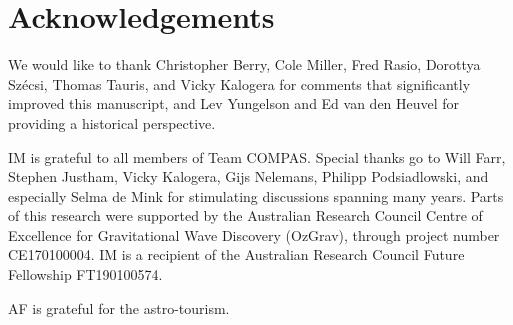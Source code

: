 \documentclass[review]{elsarticle}
\begin{document}
\section*{Acknowledgements}
We would like to thank Christopher Berry, Cole Miller, Fred Rasio, Dorottya Sz\'{e}csi, Thomas Tauris, and Vicky Kalogera for comments that significantly improved this manuscript, and Lev Yungelson and Ed van den Heuvel for providing a historical perspective.

IM is grateful to all members of Team COMPAS.  Special thanks go to Will Farr, Stephen Justham, Vicky Kalogera, Gijs Nelemans, Philipp Podsiadlowski, and especially Selma de Mink for stimulating discussions spanning many years.  Parts of this research were supported by the Australian Research Council Centre of Excellence for Gravitational Wave Discovery (OzGrav), through project number CE170100004.  IM is a recipient of the Australian Research Council Future Fellowship FT190100574.

AF is grateful for the astro-tourism.

%
%

%
%


\end{document}
